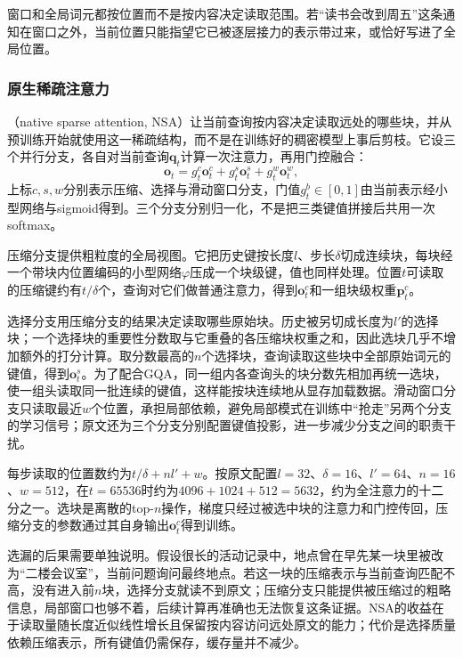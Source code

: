 窗口和全局词元都按位置而不是按内容决定读取范围。若“读书会改到周五”这条通知在窗口之外，当前位置只能指望它已被逐层接力的表示带过来，或恰好写进了全局位置。

\subsubsection{原生稀疏注意力}
\label{sec:nlp-llm-nsa}

（native sparse attention, NSA）让当前查询按内容决定读取远处的哪些块，并从预训练开始就使用这一稀疏结构，而不是在训练好的稠密模型上事后剪枝。它设三个并行分支，各自对当前查询$\bm q_t$计算一次注意力，再用门控融合：
\begin{equation}
 \bm o_t=g_t^{c}\bm o_t^{c}+g_t^{s}\bm o_t^{s}+g_t^{w}\bm o_t^{w},
 \label{eq:nlp-llm-nsa}
\end{equation}
上标$c,s,w$分别表示压缩、选择与滑动窗口分支，门值$g_t^{b}\in[0,1]$由当前表示经小型网络与sigmoid得到。三个分支分别归一化，不是把三类键值拼接后共用一次softmax。

压缩分支提供粗粒度的全局视图。它把历史键按长度$l$、步长$\delta$切成连续块，每块经一个带块内位置编码的小型网络$\varphi$压成一个块级键，值也同样处理。位置$t$可读取的压缩键约有$t/\delta$个，查询对它们做普通注意力，得到$\bm o_t^{c}$和一组块级权重$\bm p_t^{c}$。

选择分支用压缩分支的结果决定读取哪些原始块。历史被另切成长度为$l'$的选择块；一个选择块的重要性分数取与它重叠的各压缩块权重之和，因此选块几乎不增加额外的打分计算。取分数最高的$n$个选择块，查询读取这些块中全部原始词元的键值，得到$\bm o_t^{s}$。为了配合GQA，同一组内各查询头的块分数先相加再统一选块，使一组头读取同一批连续的键值，这样能按块连续地从显存加载数据。滑动窗口分支只读取最近$w$个位置，承担局部依赖，避免局部模式在训练中“抢走”另两个分支的学习信号；原文还为三个分支分别配置键值投影，进一步减少分支之间的职责干扰。

每步读取的位置数约为$t/\delta+nl'+w$。按原文配置$l=32$、$\delta=16$、$l'=64$、$n=16$、$w=512$，在$t=65536$时约为$4096+1024+512=5632$，约为全注意力的十二分之一。选块是离散的top-$n$操作，梯度只经过被选中块的注意力和门控传回，压缩分支的参数通过其自身输出$\bm o_t^{c}$得到训练。

选漏的后果需要单独说明。假设很长的活动记录中，地点曾在早先某一块里被改为“二楼会议室”，当前问题询问最终地点。若这一块的压缩表示与当前查询匹配不高，没有进入前$n$块，选择分支就读不到原文；压缩分支只能提供被压缩过的粗略信息，局部窗口也够不着，后续计算再准确也无法恢复这条证据。NSA的收益在于读取量随长度近似线性增长且保留按内容访问远处原文的能力；代价是选择质量依赖压缩表示，所有键值仍需保存，缓存量并不减少。

